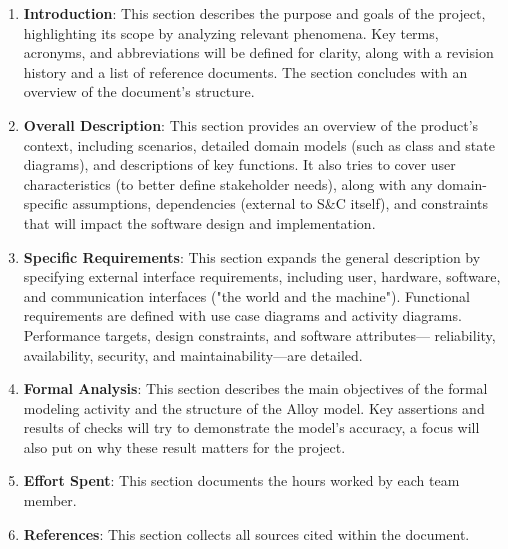 \begin{enumerate}
    \item \textbf{Introduction}: This section describes the purpose and goals of the project, highlighting its scope by
          analyzing relevant phenomena. Key terms, acronyms, and abbreviations will be defined for clarity, along with a
          revision history and a list of reference documents. The section concludes with an overview of the document’s
          structure.
    \item \textbf{Overall Description}: This section provides an overview of the product’s context, including
          scenarios, detailed domain models (such as class and state diagrams), and descriptions of key functions. It also
          tries to cover user characteristics (to better define stakeholder needs), along with any domain-specific
          assumptions, dependencies (external to S\&C itself), and constraints that will impact the software design and
          implementation.
    \item \textbf{Specific Requirements}: This section expands the general description by specifying external interface
          requirements, including user, hardware, software, and communication interfaces ("the world and the machine").
          Functional requirements are defined with use case diagrams and activity diagrams. Performance targets, design
          constraints, and software attributes— reliability, availability, security, and maintainability—are detailed.
    \item \textbf{Formal Analysis}: This section describes the main objectives of the formal modeling activity and the
          structure of the Alloy model. Key assertions and results of checks will try to demonstrate the model’s accuracy, a
          focus will also put on why these result matters for the project.
    \item \textbf{Effort Spent}: This section documents the hours worked by each team member.
    \item \textbf{References}: This section collects all sources cited within the document.
\end{enumerate}
